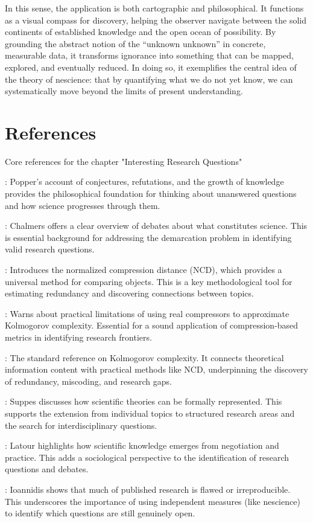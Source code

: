 In this sense, the application is both cartographic and philosophical. It functions as a visual compass for discovery, helping the observer navigate between the solid continents of established knowledge and the open ocean of possibility. By grounding the abstract notion of the “unknown unknown” in concrete, measurable data, it transforms ignorance into something that can be mapped, explored, and eventually reduced. In doing so, it exemplifies the central idea of the theory of nescience: that by quantifying what we do not yet know, we can systematically move beyond the limits of present understanding.

\section*{References}

Core references for the chapter "Interesting Research Questions"

\cite{popper2014conjectures}: Popper's account of conjectures, refutations, and the growth of knowledge provides the philosophical foundation for thinking about unanswered questions and how science progresses through them.

\cite{chalmers2013thing}: Chalmers offers a clear overview of debates about what constitutes science. This is essential background for addressing the demarcation problem in identifying valid research questions.

\cite{li2004similarity}: Introduces the normalized compression distance (NCD), which provides a universal method for comparing objects. This is a key methodological tool for estimating redundancy and discovering connections between topics.

\cite{cebrian2005common}: Warns about practical limitations of using real compressors to approximate Kolmogorov complexity. Essential for a sound application of compression-based metrics in identifying research frontiers.

\cite{li2013introduction}: The standard reference on Kolmogorov complexity. It connects theoretical information content with practical methods like NCD, underpinning the discovery of redundancy, miscoding, and research gaps.

\cite{suppes2002representation}: Suppes discusses how scientific theories can be formally represented. This supports the extension from individual topics to structured research areas and the search for interdisciplinary questions.

\cite{latour2013laboratory}: Latour highlights how scientific knowledge emerges from negotiation and practice. This adds a sociological perspective to the identification of research questions and debates.

\cite{ioannidis2005most}: Ioannidis shows that much of published research is flawed or irreproducible. This underscores the importance of using independent measures (like nescience) to identify which questions are still genuinely open.


